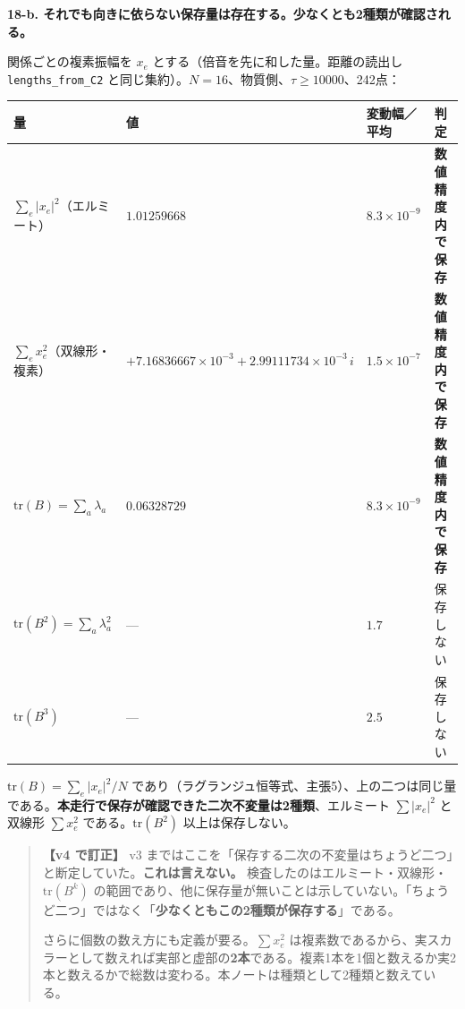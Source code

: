 \documentclass[
  10pt,
]{ltjsarticle}
\newcounter{none} %
\begin{document}
\textbf{18-b.
それでも向きに依らない保存量は存在する。少なくとも2種類が確認される。}

関係ごとの複素振幅を \(x_e\) とする（倍音を先に和した量。距離の読出し
\texttt{lengths\_from\_C2}
と同じ集約）。\(N=16\)、物質側、\(\tau \ge 10000\)、242点：

{\def\LTcaptype{none} %
\begin{longtable}[]{@{}
  >{\raggedright\arraybackslash}p{}
  >{\raggedright\arraybackslash}p{}
  >{\raggedright\arraybackslash}p{}
  >{\raggedright\arraybackslash}p{}@{}}
\toprule\noalign{}
\begin{minipage}[b]{\linewidth}\raggedright
量
\end{minipage} & \begin{minipage}[b]{\linewidth}\raggedright
値
\end{minipage} & \begin{minipage}[b]{\linewidth}\raggedright
変動幅／平均
\end{minipage} & \begin{minipage}[b]{\linewidth}\raggedright
判定
\end{minipage} \\
\midrule\noalign{}
\endhead
\bottomrule\noalign{}
\endlastfoot
\(\sum_e \lvert x_e\rvert^2\)（エルミート） & \(1.01259668\) &
\(8.3\times10^{-9}\) & \textbf{数値精度内で保存} \\
\(\sum_e x_e^2\)（双線形・複素） &
\(+7.16836667\times10^{-3} + 2.99111734\times10^{-3}\,i\) &
\(1.5\times10^{-7}\) & \textbf{数値精度内で保存} \\
\(\mathrm{tr}(B) = \sum_a \lambda_a\) & \(0.06328729\) &
\(8.3\times10^{-9}\) & \textbf{数値精度内で保存} \\
\(\mathrm{tr}(B^2) = \sum_a \lambda_a^2\) & --- & \(1.7\) &
保存しない \\
\(\mathrm{tr}(B^3)\) & --- & \(2.5\) & 保存しない \\
\end{longtable}
}

\(\mathrm{tr}(B) = \sum_e\lvert x_e\rvert^2 / N\)
であり（ラグランジュ恒等式、主張5）、上の二つは同じ量である。\textbf{本走行で保存が確認できた二次不変量は2種類}、エルミート
\(\sum\lvert x_e\rvert^2\) と双線形 \(\sum x_e^2\)
である。\(\mathrm{tr}(B^2)\) 以上は保存しない。

\begin{quote}
\textbf{【v4 で訂正】} v3
まではここを「保存する二次の不変量はちょうど二つ」と断定していた。\textbf{これは言えない。}
検査したのはエルミート・双線形・\(\mathrm{tr}(B^k)\)
の範囲であり、他に保存量が無いことは示していない。「ちょうど二つ」ではなく「\textbf{少なくともこの2種類が保存する}」である。

さらに個数の数え方にも定義が要る。\(\sum x_e^2\)
は複素数であるから、実スカラーとして数えれば実部と虚部の\textbf{2本}である。複素1本を1個と数えるか実2本と数えるかで総数は変わる。本ノートは種類として2種類と数えている。
\end{quote}
\end{document}
